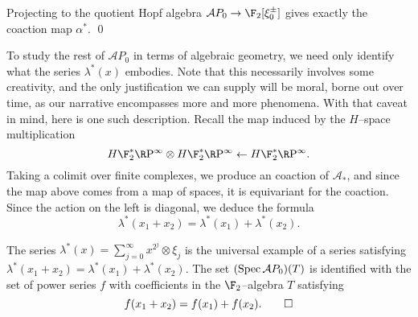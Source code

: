 \begin{lemma}
Projecting to the quotient Hopf algebra $\mathcal AP_0 \to \F_2[\xi_0^\pm]$ gives exactly the coaction map $\alpha^*$. \qed
\end{lemma}


To study the rest of $\mathcal AP_0$ in terms of algebraic geometry, we need only identify what the series $\lambda^*(x)$ embodies.  Note that this necessarily involves some creativity, and the only justification we can supply will be moral, borne out over time, as our narrative encompasses more and more phenomena.  With that caveat in mind, here is one such description.  Recall the map induced by the $H$--space multiplication \[H\F_2^* \RP^\infty \otimes H\F_2^* \RP^\infty \leftarrow H\F_2^* \RP^\infty.\]  Taking a colimit over finite complexes, we produce an coaction of $\mathcal A_*$, and since the map above comes from a map of spaces, it is equivariant for the coaction.  Since the action on the left is diagonal, we deduce the formula \[\lambda^*(x_1 + x_2) = \lambda^*(x_1) + \lambda^*(x_2).\]

\begin{lemma}\label{SteenrodAlgIdentifiedWithAutGa}
The series $\lambda^*(x) = \sum_{j=0}^\infty x^{2^j} \otimes \xi_j$ is the universal example of a series satisfying $\lambda^*(x_1 + x_2) = \lambda^*(x_1) + \lambda^*(x_2)$.  The set $(\operatorname{Spec} \mathcal AP_0)(T)$ is identified with the set of power series $f$ with coefficients in the $\F_2$--algebra $T$ satisfying \[f(x_1 + x_2) = f(x_1) + f(x_2). \qed\]
\end{lemma}

